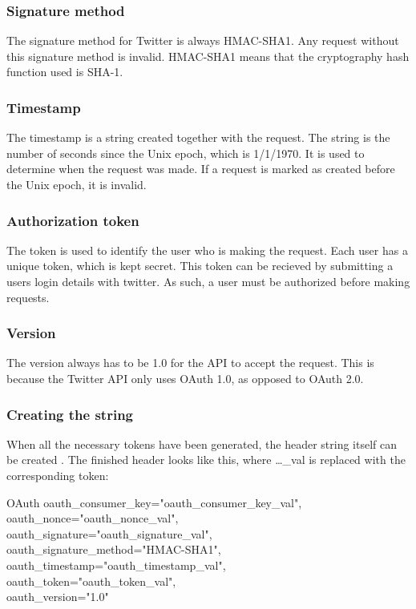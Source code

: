 % 
 
\subsubsection*{Signature method}
The signature method for Twitter is always HMAC-SHA1. Any request without this
signature method is invalid. HMAC-SHA1 means that the cryptography hash function
used is \ac{SHA-1}.

\subsubsection*{Timestamp}
The timestamp is a string created together with the request. The string is the
number of seconds since the Unix epoch, which is 1/1/1970. It is used to
determine when the request was made.
If a request is marked as created before the Unix epoch, it is invalid.

\subsubsection*{Authorization token}
The token is used to identify the user who is making the request. Each user has
a unique token, which is kept secret. This token can be recieved by submitting a
users login details with twitter. As such, a user must be authorized before
making requests.


\subsubsection*{Version}
The version always has to be 1.0 for the API to accept the
request. This is because the Twitter \ac{API} only uses OAuth 1.0, as opposed to
OAuth 2.0.

\subsubsection{Creating the string}
When all the necessary tokens have been generated, the header string itself can
be created \citep{TwitterAPIAuth}. The finished header looks like this, where
\ldots\_val is replaced with the corresponding token:\nl

OAuth oauth\_consumer\_key="oauth\_consumer\_key\_val",\\
oauth\_nonce="oauth\_nonce\_val", \\
oauth\_signature="oauth\_signature\_val", \\
oauth\_signature\_method="HMAC-SHA1", \\
oauth\_timestamp="oauth\_timestamp\_val", \\
oauth\_token="oauth\_token\_val", \\
oauth\_version="1.0" \\